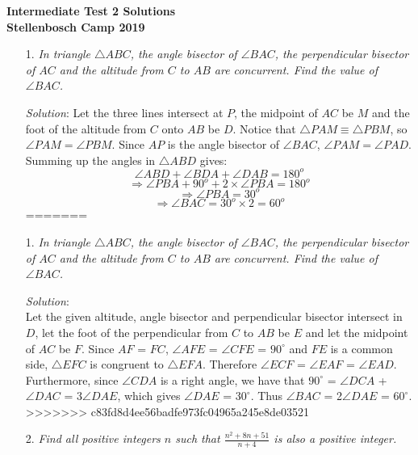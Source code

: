 \documentclass{article}
\begin{document}
\begin{center}
  \textbf{\Large Intermediate Test 2 Solutions}
  \\ \vspace{1em}
  \textbf{\large Stellenbosch Camp 2019}
\end{center}


\begin{enumerate}[1.]

<<<<<<< HEAD
\item[1.] %
\textit{In triangle $\triangle ABC$, the angle bisector of $\angle BAC$, the perpendicular bisector of $AC$ and the altitude from $C$ to $AB$ are concurrent. Find the value of $\angle BAC$.}

\textit{Solution}:
Let the three lines intersect at $P$, the midpoint of $AC$ be $M$ and the foot of the altitude from $C$ onto $AB$ be $D$. Notice that $\triangle PAM \equiv \triangle PBM$, so $\angle PAM = \angle PBM$. Since $AP$ is the angle bisector of $\angle BAC$, $\angle PAM = \angle PAD$. Summing up the angles in $\triangle ABD$ gives:
$$\angle ABD + \angle BDA + \angle DAB = 180^o$$ 
$$\Rightarrow \angle PBA + 90^o + 2 \times \angle PBA = 180^o$$
$$\Rightarrow \angle PBA = 30^o$$
$$\Rightarrow \angle BAC = 30^o \times 2 = 60^o$$
\vspace{6.81mm}
=======
\item[1.] %
\textit{In triangle $\triangle ABC$, the angle bisector of $\angle BAC$, the perpendicular bisector of $AC$ and the altitude from $C$ to $AB$ are concurrent. Find the value of $\angle BAC$.}

\textit{Solution}:
\\
Let the given altitude, angle bisector and perpendicular bisector intersect in $D$, let the foot of the perpendicular from $C$ to $AB$ be $E$ and let the midpoint of $AC$ be $F$. Since $AF$ = $FC$, $\angle AFE$ = $\angle CFE$ = $90^{\circ}$
and $FE$ is a common side, $\triangle EFC$ is congruent to $\triangle EFA$. Therefore $\angle ECF$ = $\angle EAF $ = $\angle EAD$. Furthermore, since $\angle CDA$ is a right angle, we have that $90^{\circ}$ =  $\angle DCA$ + $\angle DAC$ = 3$\angle DAE$, which gives $\angle DAE$ = $30^{\circ}$. Thus $\angle BAC$ = 2$\angle DAE$ = $60^{\circ}$.
>>>>>>> c83fd8d4ee56badfe973fc04965a245e8de03521

\item[2.] %
\textit{Find all positive integers $n$ such that $\frac{n^2 + 8n + 51}{n + 4}$ is also a positive integer.}


\end{enumerate}
\end{document}
